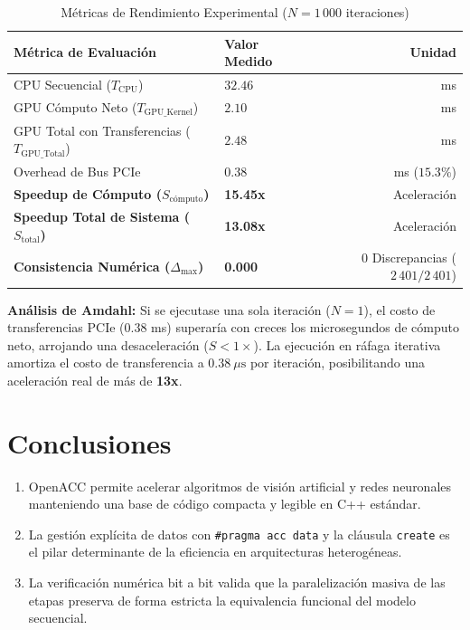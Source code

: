 \documentclass[11pt,letterpaper]{article}
\begin{document}
\begin{table}[h!]
\centering
\cambriafont
\caption{Métricas de Rendimiento Experimental ($N = 1\,000$ iteraciones)}
\vspace{0.2cm}
\begin{tabular}{llr}
\toprule
\textbf{Métrica de Evaluación} & \textbf{Valor Medido} & \textbf{Unidad} \\
\midrule
CPU Secuencial ($T_{\text{CPU}}$) & $32.46$ & ms \\
GPU Cómputo Neto ($T_{\text{GPU\_Kernel}}$) & $2.10$ & ms \\
GPU Total con Transferencias ($T_{\text{GPU\_Total}}$) & $2.48$ & ms \\
Overhead de Bus PCIe & $0.38$ & ms ($15.3\%$) \\
\midrule
\textbf{Speedup de Cómputo ($S_{\text{cómputo}}$)} & \textbf{15.45x} & Aceleración \\
\textbf{Speedup Total de Sistema ($S_{\text{total}}$)} & \textbf{13.08x} & Aceleración \\
\midrule
\textbf{Consistencia Numérica ($\Delta_{\max}$)} & \textbf{0.000} & $0$ Discrepancias ($2\,401/2\,401$) \\
\bottomrule
\end{tabular}
\end{table}

\noindent \textbf{Análisis de Amdahl:} Si se ejecutase una sola iteración ($N = 1$), el costo de transferencias PCIe ($0.38$ ms) superaría con creces los microsegundos de cómputo neto, arrojando una desaceleración ($S < 1\times$). La ejecución en ráfaga iterativa amortiza el costo de transferencia a $0.38\ \mu\text{s}$ por iteración, posibilitando una aceleración real de más de \textbf{13x}.

\section{Conclusiones}
\begin{enumerate}
    \item OpenACC permite acelerar algoritmos de visión artificial y redes neuronales manteniendo una base de código compacta y legible en C++ estándar.
    \item La gestión explícita de datos con \texttt{\#pragma acc data} y la cláusula \texttt{create} es el pilar determinante de la eficiencia en arquitecturas heterogéneas.
    \item La verificación numérica bit a bit valida que la paralelización masiva de las etapas preserva de forma estricta la equivalencia funcional del modelo secuencial.
\end{enumerate}
\end{document}
